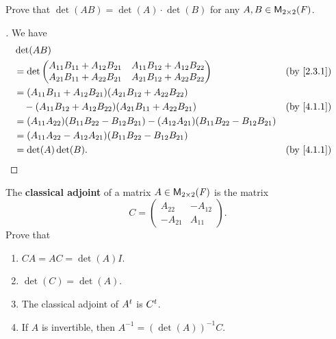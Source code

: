 \begin{ex}\label{ex:4.1.9}
  Prove that \(\det(AB) = \det(A) \cdot \det(B)\) for any \(A, B \in \mathsf{M}_{{2} \times 2}({\mathit{F}})\).
\end{ex}

\begin{proof}[]
  We have
  \begin{align*}
     & \det(AB)                                                                                                                                      \\
     & = \det\begin{pmatrix}
               A_{1 1} B_{1 1} + A_{1 2} B_{2 1} & A_{1 1} B_{1 2} + A_{1 2} B_{2 2} \\
               A_{2 1} B_{1 1} + A_{2 2} B_{2 1} & A_{2 1} B_{1 2} + A_{2 2} B_{2 2}
             \end{pmatrix}                                        &  & \text{(by \cref{2.3.1})}                                                      \\
     & = (A_{1 1} B_{1 1} + A_{1 2} B_{2 1}) (A_{2 1} B_{1 2} + A_{2 2} B_{2 2})                                                                     \\
     & \quad - (A_{1 1} B_{1 2} + A_{1 2} B_{2 2}) (A_{2 1} B_{1 1} + A_{2 2} B_{2 1})                                 &  & \text{(by \cref{4.1.1})} \\
     & = (A_{1 1} A_{2 2}) (B_{1 1} B_{2 2} - B_{1 2} B_{2 1}) - (A_{1 2} A_{2 1}) (B_{1 1} B_{2 2} - B_{1 2} B_{2 1})                               \\
     & = (A_{1 1} A_{2 2} - A_{1 2} A_{2 1}) (B_{1 1} B_{2 2} - B_{1 2} B_{2 1})                                                                     \\
     & = \det(A) \det(B).                                                                                              &  & \text{(by \cref{4.1.1})}
  \end{align*}
\end{proof}

\begin{ex}\label{ex:4.1.10}
  The \textbf{classical adjoint} of a matrix \(A \in \mathsf{M}_{{2} \times 2}({\mathit{F}})\) is the matrix
  \[
    C = \begin{pmatrix}
      A_{2 2}  & -A_{1 2} \\
      -A_{2 1} & A_{1 1}
    \end{pmatrix}.
  \]
  Prove that
  \begin{enumerate}
    \item \(CA = AC = \det(A) I\).
    \item \(\det(C) = \det(A)\).
    \item The classical adjoint of \({A}^{t}\) is \({C}^{t}\).
    \item If \(A\) is invertible, then \(A^{-1} = (\det(A))^{-1} C\).
  \end{enumerate}
\end{ex}

